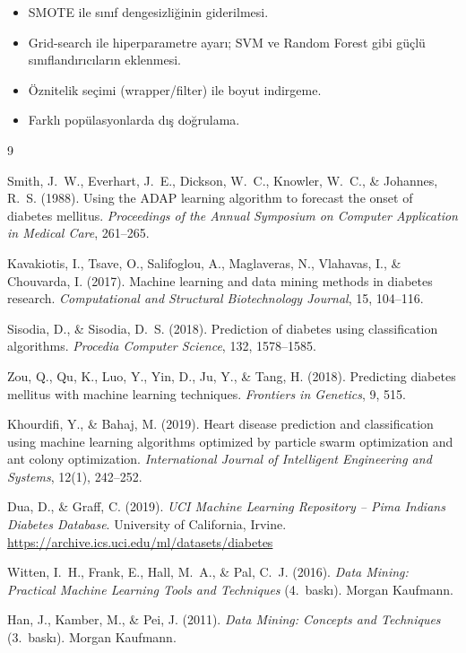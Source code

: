\documentclass[12pt,a4paper]{article}
\begin{document}
\begin{itemize}
  \item SMOTE ile sınıf dengesizliğinin giderilmesi.
  \item Grid-search ile hiperparametre ayarı; SVM ve Random Forest gibi
        güçlü sınıflandırıcıların eklenmesi.
  \item Öznitelik seçimi (wrapper/filter) ile boyut indirgeme.
  \item Farklı popülasyonlarda dış doğrulama.
\end{itemize}

\newpage
\begin{thebibliography}{9}

Smith, J.~W., Everhart, J.~E., Dickson, W.~C., Knowler, W.~C., \& Johannes, R.~S. (1988).
Using the ADAP learning algorithm to forecast the onset of diabetes mellitus.
\textit{Proceedings of the Annual Symposium on Computer Application in Medical Care}, 261--265.

Kavakiotis, I., Tsave, O., Salifoglou, A., Maglaveras, N., Vlahavas, I., \& Chouvarda, I. (2017).
Machine learning and data mining methods in diabetes research.
\textit{Computational and Structural Biotechnology Journal}, 15, 104--116.

Sisodia, D., \& Sisodia, D.~S. (2018).
Prediction of diabetes using classification algorithms.
\textit{Procedia Computer Science}, 132, 1578--1585.

Zou, Q., Qu, K., Luo, Y., Yin, D., Ju, Y., \& Tang, H. (2018).
Predicting diabetes mellitus with machine learning techniques.
\textit{Frontiers in Genetics}, 9, 515.

Khourdifi, Y., \& Bahaj, M. (2019).
Heart disease prediction and classification using machine learning algorithms
optimized by particle swarm optimization and ant colony optimization.
\textit{International Journal of Intelligent Engineering and Systems}, 12(1), 242--252.

Dua, D., \& Graff, C. (2019).
\textit{UCI Machine Learning Repository -- Pima Indians Diabetes Database}.
University of California, Irvine.
\url{https://archive.ics.uci.edu/ml/datasets/diabetes}

Witten, I.~H., Frank, E., Hall, M.~A., \& Pal, C.~J. (2016).
\textit{Data Mining: Practical Machine Learning Tools and Techniques} (4.~baskı).
Morgan Kaufmann.

Han, J., Kamber, M., \& Pei, J. (2011).
\textit{Data Mining: Concepts and Techniques} (3.~baskı).
Morgan Kaufmann.

\end{thebibliography}
\end{document}
